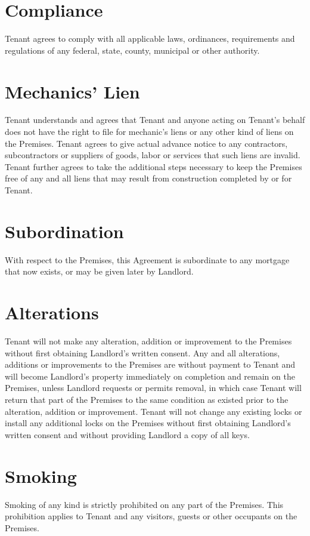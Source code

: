 \documentclass[12pt]{article}
\begin{document}
{\section{Compliance}
Tenant agrees to comply with all applicable laws, ordinances, requirements and regulations of
any federal, state, county, municipal or other authority.

\section{Mechanics' Lien}
Tenant understands and agrees that Tenant and anyone acting on Tenant's behalf does not have
the right to file for mechanic's liens or any other kind of liens on the Premises. Tenant
agrees to give actual advance notice to any contractors, subcontractors or suppliers of goods,
labor or services that such liens are invalid. Tenant further agrees to take the additional
steps necessary to keep the Premises free of any and all liens that may result from
construction completed by or for Tenant.

\section{Subordination}
With respect to the Premises, this Agreement is subordinate to any mortgage that now exists,
or may be given later by Landlord.

\section{Alterations}
Tenant will not make any alteration, addition or improvement to the Premises without first
obtaining Landlord's written consent. Any and all alterations, additions or improvements to
the Premises are without payment to Tenant and will become Landlord's property immediately on
completion and remain on the Premises, unless Landlord requests or permits removal, in which
case Tenant will return that part of the Premises to the same condition as existed prior to the
alteration, addition or improvement. Tenant will not change any existing locks or install any
additional locks on the Premises without first obtaining Landlord's written consent and without
providing Landlord a copy of all keys.

\section{Smoking}
Smoking of any kind is strictly prohibited on any part of the Premises. This prohibition
applies to Tenant and any visitors, guests or other occupants on the Premises.

}
\end{document}
